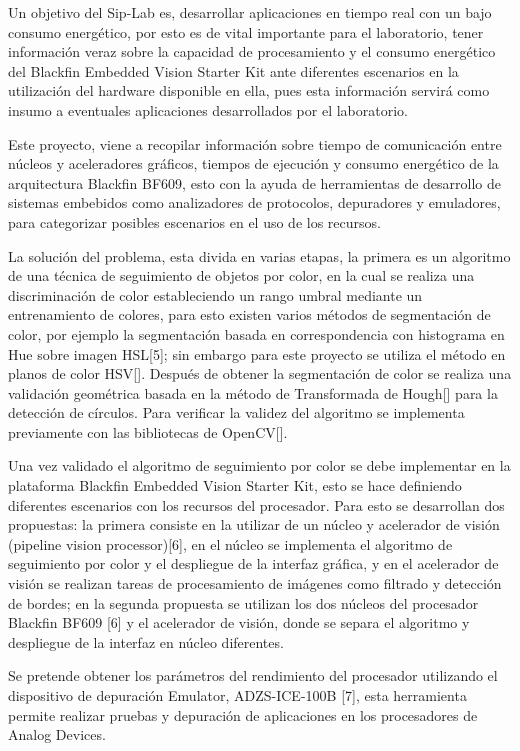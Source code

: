 Un objetivo del Sip-Lab es, desarrollar aplicaciones en tiempo real con un bajo consumo energético, por esto es de vital importante para el laboratorio, tener información veraz sobre la capacidad de procesamiento y el consumo energético del Blackfin Embedded Vision Starter Kit ante diferentes escenarios en la utilización del hardware disponible en ella, pues esta información servirá como insumo a eventuales aplicaciones desarrollados por el laboratorio.

Este proyecto, viene a recopilar información sobre tiempo de comunicación entre núcleos y aceleradores gráficos, tiempos de ejecución y consumo energético de la arquitectura Blackfin BF609, esto con la ayuda de herramientas de desarrollo de sistemas embebidos como analizadores de protocolos, depuradores y emuladores, para categorizar posibles escenarios en el uso de los recursos. 

La solución del problema, esta divida en varias etapas, la primera es un algoritmo de una técnica de seguimiento de objetos por color, en la cual se realiza una discriminación de color estableciendo un rango umbral mediante un entrenamiento de colores, para esto existen varios métodos de segmentación de color, por ejemplo la segmentación basada en correspondencia con histograma en Hue sobre imagen HSL[5]; sin embargo para este proyecto se utiliza el método en planos de color HSV[]. Después de obtener la segmentación de color se realiza una validación geométrica basada en la método de Transformada de Hough[] para la detección de círculos. Para verificar la validez del algoritmo se implementa previamente con las bibliotecas de OpenCV[].

Una vez validado el algoritmo de seguimiento por color se debe implementar en la plataforma Blackfin Embedded Vision Starter Kit, esto se hace definiendo diferentes escenarios con los recursos del procesador. Para esto se desarrollan dos propuestas: la primera consiste en la utilizar de un núcleo y acelerador de visión (pipeline vision processor)[6], en el núcleo se implementa el algoritmo de seguimiento por color y el despliegue de la interfaz gráfica, y en el acelerador de visión se realizan tareas de procesamiento de imágenes como filtrado y detección de bordes; en la segunda propuesta se utilizan los dos núcleos del procesador Blackfin BF609 [6] y el acelerador de visión, donde se separa el algoritmo y despliegue de la interfaz en núcleo diferentes.  

Se pretende obtener los parámetros del rendimiento del procesador utilizando el dispositivo de depuración Emulator, ADZS-ICE-100B [7], esta herramienta permite realizar pruebas y depuración de aplicaciones en los procesadores de Analog Devices.   
\\
\\
\\


